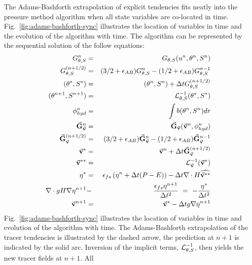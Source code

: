 The Adams-Bashforth extrapolation of explicit tendencies fits neatly
into the pressure method algorithm when all state variables are
co-located in time. Fig.~\ref{fig:adams-bashforth-sync} illustrates
the location of variables in time and the evolution of the algorithm
with time. The algorithm can be represented by the sequential solution
of the follow equations:
\begin{eqnarray}
G_{\theta,S}^{n} & = & G_{\theta,S} ( u^n, \theta^n, S^n )
\label{eq:Gt-n-sync} \\
G_{\theta,S}^{(n+1/2)} & = & (3/2+\epsilon_{AB}) G_{\theta,S}^{n}-(1/2+\epsilon_{AB}) G_{\theta,S}^{n-1}
\label{eq:Gt-n+5-sync} \\
(\theta^*,S^*) & = & (\theta^{n},S^{n}) + \Delta t G_{\theta,S}^{(n+1/2)}
\label{eq:tstar-sync} \\
(\theta^{n+1},S^{n+1}) & = & {\cal L}^{-1}_{\theta,S} (\theta^*,S^*)
\label{eq:t-n+1-sync} \\
\phi^n_{hyd} & = & \int b(\theta^n,S^n) dr
\label{eq:phi-hyd-sync} \\
\vec{\bf G}_{\vec{\bf v}}^{n} & = & \vec{\bf G}_{\vec{\bf v}} ( \vec{\bf v}^n, \phi^n_{hyd} )
\label{eq:Gv-n-sync} \\
\vec{\bf G}_{\vec{\bf v}}^{(n+1/2)} & = & (3/2 + \epsilon_{AB} ) \vec{\bf G}_{\vec{\bf v}}^{n} - (1/2 + \epsilon_{AB} ) \vec{\bf G}_{\vec{\bf v}}^{n-1}
\label{eq:Gv-n+5-sync} \\
\vec{\bf v}^{*} & = & \vec{\bf v}^{n} + \Delta t \vec{\bf G}_{\vec{\bf v}}^{(n+1/2)}
\label{eq:vstar-sync} \\
\vec{\bf v}^{**} & = & {\cal L}_{\vec{\bf v}}^{-1} ( \vec{\bf v}^* )
\label{eq:vstarstar-sync} \\
\eta^* & = & \epsilon_{fs} \left( \eta^{n} + \Delta t (P-E) \right)- \Delta t 
  \nabla \cdot H \widehat{ \vec{\bf v}^{**} }
\label{eq:nstar-sync} \\
\nabla \cdot g H \nabla \eta^{n+1} & - & \frac{\epsilon_{fs} \eta^{n+1}}{\Delta t^2}
~ = ~ - \frac{\eta^*}{\Delta t^2}
\label{eq:elliptic-sync} \\
\vec{\bf v}^{n+1} & = & \vec{\bf v}^{*} - \Delta t g \nabla \eta^{n+1}
\label{eq:v-n+1-sync}
\end{eqnarray}
Fig.~\ref{fig:adams-bashforth-sync} illustrates the location of
variables in time and evolution of the algorithm with time. The
Adams-Bashforth extrapolation of the tracer tendencies is illustrated
by the dashed arrow, the prediction at $n+1$ is indicated by the
solid arc. Inversion of the implicit terms, ${\cal
L}^{-1}_{\theta,S}$, then yields the new tracer fields at $n+1$. All
